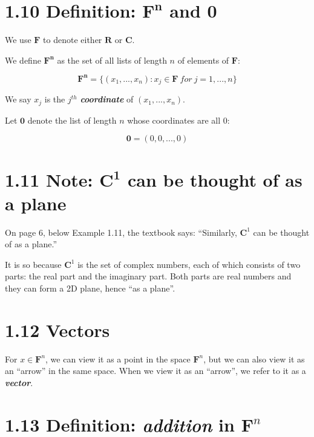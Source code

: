 \documentclass[12pt, letterpaper, oneside]{book}
\begin{document}
\section{1.10 Definition: $\mathbf{F^n}$ and $\mathbf{0}$}

We use $\mathbf{F}$ to denote either $\mathbf{R}$ or $\mathbf{C}$.

We define $\mathbf{F^n}$ as the set of all lists of length $n$ of elements of
$\mathbf{F}$:

\[
  \mathbf{F^n} = \{(x_1, ..., x_n): x_j \in \mathbf{F} \ for \ j = 1, ..., n\}
\]

We say $x_j$ is the $j^{th}$ \textbf{\textit{coordinate}} of $(x_1, ..., x_n)$.

Let $\mathbf{0}$ denote the list of length $n$ whose coordinates are all $0$:

\[
  \mathbf{0} = (0, 0, ..., 0)
\]

\section{1.11 Note: $\mathbf{C^1}$ can be thought of as a plane}

On page 6, below Example 1.11, the textbook says: ``Similarly, $\mathbf{C}^1$
can be thought of as a plane.''

It is so because $\mathbf{C}^1$ is the set of complex numbers, each of which
consists of two parts: the real part and the imaginary part. Both parts are real
numbers and they can form a 2D plane, hence ``as a plane''.

\section{1.12 Vectors}

For $x \in \mathbf{F}^n$, we can view it as a point in the space $\mathbf{F}^n$,
but we can also view it as an ``arrow'' in the same space. When we view it as
an ``arrow'', we refer to it as a \textbf{\textit{vector}}.

\section{1.13 Definition: \textit{addition} in $\mathbf{F}^n$}
\end{document}
